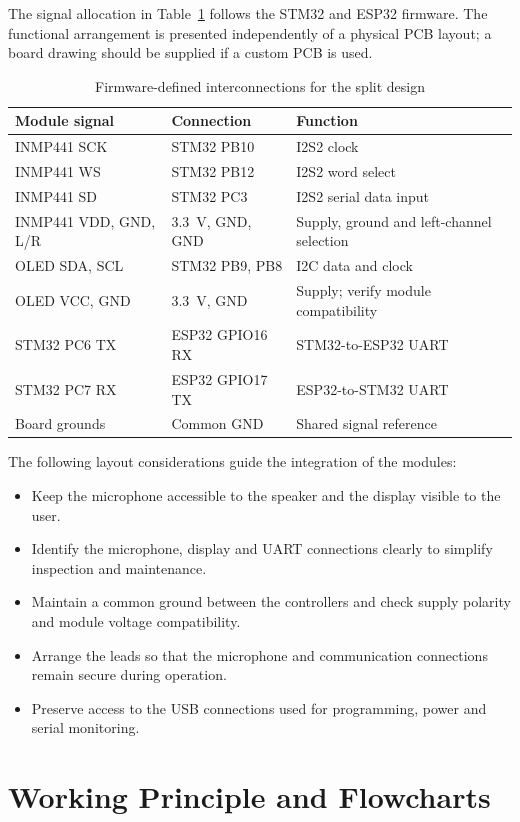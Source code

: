 The signal allocation in Table~\ref{tab:wiring} follows the STM32 and ESP32 firmware. The functional arrangement is presented independently of a physical PCB layout; a board drawing should be supplied if a custom PCB is used.
\begin{table}[htbp]
\centering
\caption{Firmware-defined interconnections for the split design}
\label{tab:wiring}
\small
\begin{tabularx}{\textwidth}{@{}l l X@{}}
\toprule
Module signal & Connection & Function \\
\midrule
INMP441 SCK & STM32 PB10 & I2S2 clock \\
INMP441 WS & STM32 PB12 & I2S2 word select \\
INMP441 SD & STM32 PC3 & I2S2 serial data input \\
INMP441 VDD, GND, L/R & 3.3~V, GND, GND & Supply, ground and left-channel selection \\
OLED SDA, SCL & STM32 PB9, PB8 & I2C data and clock \\
OLED VCC, GND & 3.3~V, GND & Supply; verify module compatibility \\
STM32 PC6 TX & ESP32 GPIO16 RX & STM32-to-ESP32 UART \\
STM32 PC7 RX & ESP32 GPIO17 TX & ESP32-to-STM32 UART \\
Board grounds & Common GND & Shared signal reference \\
\bottomrule
\end{tabularx}
\end{table}

The following layout considerations guide the integration of the modules:
\begin{itemize}
\item Keep the microphone accessible to the speaker and the display visible to the user.
\item Identify the microphone, display and UART connections clearly to simplify inspection and maintenance.
\item Maintain a common ground between the controllers and check supply polarity and module voltage compatibility.
\item Arrange the leads so that the microphone and communication connections remain secure during operation.
\item Preserve access to the USB connections used for programming, power and serial monitoring.
\end{itemize}

\section{Working Principle and Flowcharts}
\label{sec:working}

